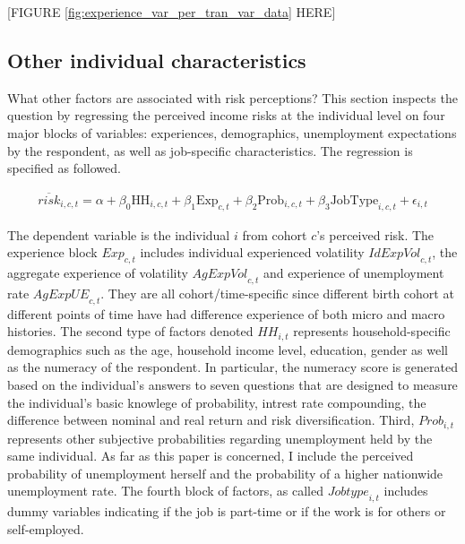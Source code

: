 \documentclass[12pt,notitlepage,onecolumn,aps,pra]{article}
\begin{document}
\begin{center}
[FIGURE \ref{fig:experience_var_per_tran_var_data} HERE]
\end{center}






    \hypertarget{other-individual-characteristics}{%
\subsection{Other individual
characteristics}\label{other-individual-characteristics}}

What other factors are associated with risk perceptions? This section
inspects the question by regressing the perceived income risks at the
individual level on four major blocks of variables: experiences,
demographics, unemployment expectations by the respondent, as well as
job-specific characteristics. The regression is specified as followed.

\begin{eqnarray}
\overline{risk}_{i,c,t} = \alpha + \beta_0 \textrm{HH}_{i,c,t} + \beta_1 \textrm{Exp}_{c,t} + \beta_2 \textrm{Prob}_{i,c,t} + \beta_3 \textrm{JobType}_{i,c,t} + \epsilon_{i,t}
\end{eqnarray}

The dependent variable is the individual \(i\) from cohort \(c\)'s
perceived risk. The experience block \(\textit{Exp}_{c,t}\) includes
individual experienced volatility \(\textit{IdExpVol}_{c,t}\), the
aggregate experience of volatility \(\textit{AgExpVol}_{c,t}\) and
experience of unemployment rate \(\textit{AgExpUE}_{c,t}\). They are all
cohort/time-specific since different birth cohort at different points of
time have had difference experience of both micro and macro histories.
The second type of factors denoted \(\textit{HH}_{i,t}\) represents
household-specific demographics such as the age, household income level,
education, gender as well as the numeracy of the respondent. In
particular, the numeracy score is generated based on the individual's
answers to seven questions that are designed to measure the individual's
basic knowlege of probability, intrest rate compounding, the difference
between nominal and real return and risk diversification. Third,
\(\textit{Prob}_{i,t}\) represents other subjective probabilities
regarding unemployment held by the same individual. As far as this paper
is concerned, I include the perceived probability of unemployment
herself and the probability of a higher nationwide unemployment rate.
The fourth block of factors, as called \(\textit{Jobtype}_{i,t}\)
includes dummy variables indicating if the job is part-time or if the
work is for others or self-employed.
\end{document}
